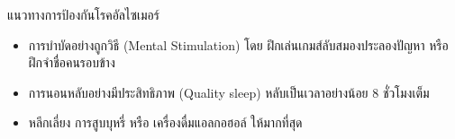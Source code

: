 \documentclass[xetex,serif]{beamer}
\begin{document}
\begin{frame}{แนวทางการป้องกันโรคอัลไซเมอร์}
  \begin{itemize}
    \item การบำบัดอย่างถูกวิธี (Mental Stimulation) โดย ฝึกเล่นเกมส์ลับสมองประลองปัญหา หรือ ฝึกจําชื่อคนรอบข้าง
    \item การนอนหลับอย่างมีประสิทธิภาพ (Quality sleep) หลับเป็นเวลาอย่างน้อย 8 ชั่วโมงเต็ม
    \item หลีกเลี่ยง การสูบบุหรี่ หรือ เครื่องดื่มแอลกอฮอล์ ให้มากที่สุด
  \end{itemize}
\end{frame}
\end{document}
